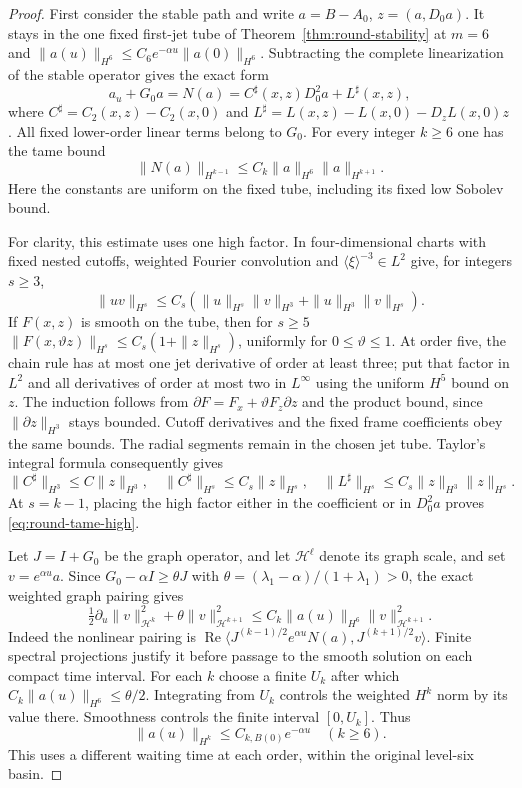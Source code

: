 \documentclass[11pt]{article}
\numberwithin{equation}{section}
\theoremstyle{definition}
\theoremstyle{remark}
\begin{document}
\begin{proof}
First consider the stable path and write $a=B-A_0$,
$z=(a,D_0a)$. It stays in the one fixed first-jet tube
of Theorem~\ref{thm:round-stability} at $m=6$ and
$\|a(u)\|_{H^6}\le C_6e^{-\alpha u}\|a(0)\|_{H^6}$.
Subtracting the complete linearization of the stable
operator gives the exact form
\[
 a_u+G_0a=N(a)=C^\sharp(x,z)D_0^2a+L^\sharp(x,z),
\]
where $C^\sharp=C_2(x,z)-C_2(x,0)$ and
$L^\sharp=L(x,z)-L(x,0)-D_zL(x,0)z$.
All fixed lower-order linear terms belong to $G_0$.
For every integer $k\ge6$ one has the tame bound
\begin{equation}\label{eq:round-tame-high}
 \|N(a)\|_{H^{k-1}}
       \le C_k\|a\|_{H^6}\|a\|_{H^{k+1}}.
\end{equation}
Here the constants are uniform on the fixed tube,
including its fixed low Sobolev bound.

For clarity, this estimate uses one high factor.
In four-dimensional charts with fixed nested cutoffs,
weighted Fourier convolution and
$\langle\xi\rangle^{-3}\in L^2$ give, for integers $s\ge3$,
\[
 \|uv\|_{H^s}\le C_s
    (\|u\|_{H^s}\|v\|_{H^3}+\|u\|_{H^3}\|v\|_{H^s}).
\]
If $F(x,z)$ is smooth on the tube, then for $s\ge5$
$\|F(x,\vartheta z)\|_{H^s}\le C_s(1+\|z\|_{H^s})$,
uniformly for $0\le\vartheta\le1$.
At order five, the chain rule has at most one jet
derivative of order at least three; put that factor in
$L^2$ and all derivatives of order at most two in
$L^\infty$ using the uniform $H^5$ bound on $z$.
The induction follows from
$\partial F=F_x+\vartheta F_z\partial z$ and the product
bound, since $\|\partial z\|_{H^3}$ stays bounded.
Cutoff derivatives and the fixed frame coefficients obey
the same bounds. The radial segments remain in the
chosen jet tube.
Taylor's integral formula consequently gives
\[
 \|C^\sharp\|_{H^3}\le C\|z\|_{H^3},\quad
 \|C^\sharp\|_{H^s}\le C_s\|z\|_{H^s},\quad
 \|L^\sharp\|_{H^s}\le C_s\|z\|_{H^3}\|z\|_{H^s}.
\]
At $s=k-1$, placing the high factor either in the
coefficient or in $D_0^2a$ proves
\eqref{eq:round-tame-high}.

Let $J=I+G_0$ be the graph operator, and let $\mathcal H^\ell$ denote its graph
scale, and set $v=e^{\alpha u}a$.
Since
$G_0-\alpha I\ge\theta J$ with
$\theta=(\lambda_1-\alpha)/(1+\lambda_1)>0$,
the exact weighted graph pairing gives
\[
 \tfrac12\partial_u\|v\|_{\mathcal H^k}^2
 +\theta\|v\|_{\mathcal H^{k+1}}^2
 \le C_k\|a(u)\|_{H^6}\|v\|_{\mathcal H^{k+1}}^2.
\]
Indeed the nonlinear pairing is
$\operatorname{Re}\langle
J^{(k-1)/2}e^{\alpha u}N(a),J^{(k+1)/2}v\rangle$.
Finite spectral projections justify it before passage
to the smooth solution on each compact time interval.
For each $k$ choose a finite $U_k$ after which
$C_k\|a(u)\|_{H^6}\le\theta/2$.
Integrating from $U_k$ controls the weighted $H^k$
norm by its value there. Smoothness controls the
finite interval $[0,U_k]$. Thus
\begin{equation}\label{eq:round-all-orders}
 \|a(u)\|_{H^k}\le C_{k,B(0)}e^{-\alpha u}
 \quad(k\ge6).
\end{equation}
This uses a different waiting time at each order,
within the original level-six basin.


\end{proof}
\end{document}
